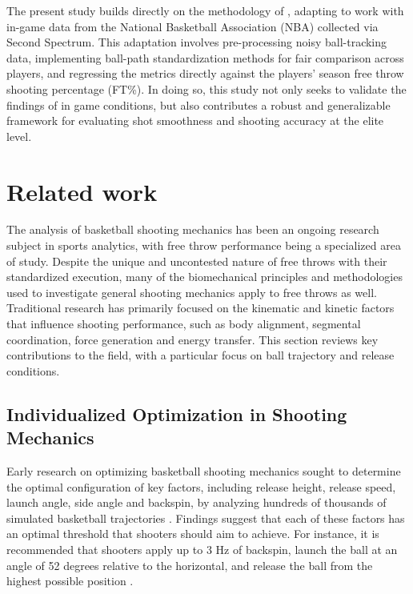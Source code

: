 \documentclass{article}
\begin{document}
    The present study builds directly on the methodology of \citet{slegers_role_2024}, adapting to work with in-game data from the National Basketball Association (NBA) collected via Second Spectrum. This adaptation involves pre-processing noisy ball-tracking data, implementing ball-path standardization methods for fair comparison across players, and regressing the metrics directly against the players' season free throw shooting percentage (FT\%). In doing so, this study not only seeks to validate the findings of \citet{slegers_role_2024} in game conditions, but also contributes a robust and generalizable framework for evaluating shot smoothness and shooting accuracy at the elite level.

  \section{Related work}
  
    The analysis of basketball shooting mechanics has been an ongoing research subject in sports analytics, with free throw performance being a specialized area of study. Despite the unique and uncontested nature of free throws with their standardized execution, many of the biomechanical principles and methodologies used to investigate general shooting mechanics apply to free throws as well. Traditional research has primarily focused on the kinematic and kinetic factors that influence shooting performance, such as body alignment, segmental coordination, force generation and energy transfer. This section reviews key contributions to the field, with a particular focus on ball trajectory and release conditions.

    \subsection{Individualized Optimization in Shooting Mechanics}

      Early research on optimizing basketball shooting mechanics sought to determine the optimal configuration of key factors, including release height, release speed, launch angle, side angle and backspin, by analyzing hundreds of thousands of simulated basketball trajectories \citep{tran_optimal_2008}. Findings suggest that each of these factors has an optimal threshold that shooters should aim to achieve. For instance, it is recommended that shooters apply up to 3 Hz of backspin, launch the ball at an angle of 52 degrees relative to the horizontal, and release the ball from the highest possible position \citep{tran_optimal_2008}.
\end{document}
